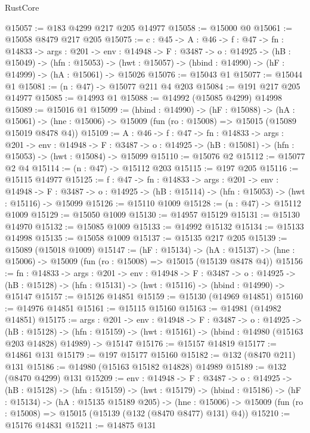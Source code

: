 \begin{lexlean}{RustCore}
\begin{coremodule}
@15057 := @183 @4299 @217 @205 @14977
@15058 := @15000 @0
@15061 := @15058 @8479 @217 @205
@15075 := {c : @45} ->
  {A : @46} ->
  {f : @47} ->
  {fn : @14833} ->
  {args : @201} ->
  {env : @14948} ->
  {F : @3487} ->
  {o : @14925} ->
  (hB : @15049) ->
  (hfn : @15053) -> (hwt : @15057) -> (hbind : @14990) -> (hF : @14999) -> (hA : @15061) -> @15026
@15076 := @15043 @1
@15077 := @15044 @1
@15081 := (n : @47) -> @15077 @211 @4 @203
@15084 := @191 @217 @205 @14977
@15085 := @14993 @1
@15088 := @14992 (@15085 @4299) @14998
@15089 := @15016 @1
@15099 := (hbind : @14990) ->
  (hF : @15088) ->
  (hA : @15061) -> (hne : @15006) -> @15009 (fun (ro : @15008) => @15015 (@15089 @15019 @8478 @4))
@15109 := {A : @46} ->
  {f : @47} ->
  {fn : @14833} ->
  {args : @201} ->
  {env : @14948} ->
  {F : @3487} -> {o : @14925} -> (hB : @15081) -> (hfn : @15053) -> (hwt : @15084) -> @15099
@15110 := @15076 @2
@15112 := @15077 @2 @4
@15114 := (n : @47) -> @15112 @203
@15115 := @197 @205
@15116 := @15115 @14977
@15125 := {f : @47} ->
  {fn : @14833} ->
  {args : @201} ->
  {env : @14948} ->
  {F : @3487} -> {o : @14925} -> (hB : @15114) -> (hfn : @15053) -> (hwt : @15116) -> @15099
@15126 := @15110 @1009
@15128 := (n : @47) -> @15112 @1009
@15129 := @15050 @1009
@15130 := @14957 @15129
@15131 := @15130 @14970
@15132 := @15085 @1009
@15133 := @14992 @15132
@15134 := @15133 @14998
@15135 := @15058 @1009
@15137 := @15135 @217 @205
@15139 := @15089 (@15018 @1009)
@15147 := (hF : @15134) ->
  (hA : @15137) -> (hne : @15006) -> @15009 (fun (ro : @15008) => @15015 (@15139 @8478 @4))
@15156 := {fn : @14833} ->
  {args : @201} ->
  {env : @14948} ->
  {F : @3487} ->
  {o : @14925} -> (hB : @15128) -> (hfn : @15131) -> (hwt : @15116) -> (hbind : @14990) -> @15147
@15157 := @15126 @14851
@15159 := @15130 (@14969 @14851)
@15160 := @14976 @14851
@15161 := @15115 @15160
@15163 := @14981 (@14982 @14851)
@15175 := {args : @201} ->
  {env : @14948} ->
  {F : @3487} ->
  {o : @14925} ->
  (hB : @15128) ->
  (hfn : @15159) -> (hwt : @15161) -> (hbind : @14980 (@15163 @203 @14828) @14989) -> @15147
@15176 := @15157 @14819
@15177 := @14861 @131
@15179 := @197 @15177 @15160
@15182 := @132 (@8470 @211) @131
@15186 := @14980 (@15163 @15182 @14828) @14989
@15189 := @132 (@8470 @4299) @131
@15209 := {env : @14948} ->
  {F : @3487} ->
  {o : @14925} ->
  (hB : @15128) ->
  (hfn : @15159) ->
  (hwt : @15179) ->
  (hbind : @15186) ->
  (hF : @15134) ->
  (hA : @15135 @15189 @205) ->
  (hne : @15006) -> @15009 (fun (ro : @15008) => @15015 (@15139 (@132 (@8470 @8477) @131) @4))
@15210 := @15176 @14831
@15211 := @14875 @131

\end{coremodule}
\end{lexlean}
